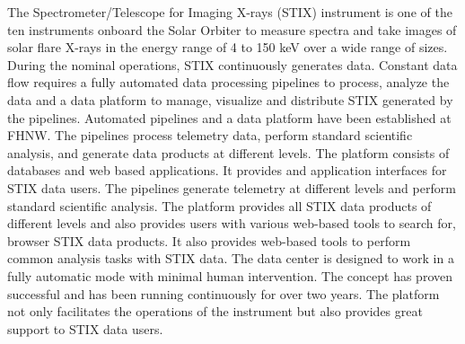\documentclass[referee]{aa} %
\begin{document}
  \abstract
   {The Spectrometer/Telescope for Imaging X-rays (STIX) instrument is one 
   of the ten instruments onboard the Solar Orbiter to measure spectra and take images of solar flare X-rays in the energy range of 4 to 150 keV over a wide range of sizes.} %
   {During the nominal operations, STIX continuously generates data. Constant data flow requires a fully automated data processing pipelines to process,
     analyze the data and a data platform to manage, 
   visualize and distribute STIX generated by the pipelines.   
   }
   {
    Automated pipelines and a data platform have been established at FHNW. The pipelines process telemetry data, perform standard scientific analysis, 
    and generate data products at different levels.  
   The platform consists of databases and web based applications. It provides  and application interfaces for STIX data users.  
   The pipelines generate telemetry at different levels and perform standard scientific analysis. 
   }
   {
 The platform provides 
 all STIX data products of different levels and also provides users 
 with various web-based tools to search for,  browser STIX data products. 
 It also provides web-based tools to perform common analysis tasks with STIX data. 
  The data center is designed to work in a fully automatic mode with minimal human intervention. The concept has proven successful 
 and has been running continuously for over two years. The platform not only facilitates the operations of the instrument but also provides great support to STIX data users.}
\end{document}
